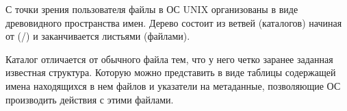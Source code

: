 С точки зрения пользователя файлы в ОС UNIX организованы в виде древовидного пространства имен. Дерево состоит из ветвей (каталогов) начиная от (/) и заканчивается листьями (файлами).

Каталог отличается от обычного файла тем, что у него четко заранее заданная известная структура. Которую можно представить в виде таблицы содержащей имена находящихся в нем файлов и указатели на метаданные, позволяющие ОС производить действия с этими файлами.
